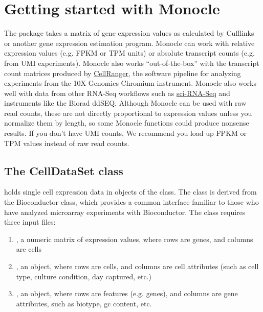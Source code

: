 \documentclass[10pt,oneside]{article}\usepackage[]{graphicx}\usepackage[]{color}
\begin{document}
 \section{Getting started with Monocle}
 
 The  package takes a matrix of gene expression values as calculated by Cufflinks\cite{Trapnell:2012kp} or another gene expression estimation program. Monocle can work with relative expression values (e.g. FPKM or TPM units) or absolute transcript counts (e.g. from UMI experiments). Monocle also works ``out-of-the-box'' with the transcript count matrices produced by \href{https://support.10xgenomics.com/single-cell/software/overview/welcome}{CellRanger}, the software pipeline for analyzing experiments from the 10X Genomics Chromium instrument. Monocle also works well with data from other RNA-Seq workflows such as \href{http://biorxiv.org/content/early/2017/02/02/104844}{sci-RNA-Seq} and instruments like the Biorad ddSEQ. Although Monocle can be used with raw read counts, these are not directly proportional to expression values unless you normalize them by length, so some Monocle functions could produce nonsense results. If you don't have UMI counts, We recommend you load up FPKM or TPM values instead of raw read counts.
 
 \subsection{The CellDataSet class}
 
  holds single cell expression data in objects of the  class. The class is derived from the Bioconductor  class, which provides a common interface familiar to those who have analyzed microarray experiments with Bioconductor. The class requires three input files:
 \begin{enumerate}
 \item {}, a numeric matrix of expression values, where rows are genes, and columns are cells
 \item {}, an  object, where rows are cells, and columns are cell attributes (such as cell type, culture condition, day captured, etc.)
 \item {}, an  object, where rows are features (e.g. genes), and columns are gene attributes, such as biotype, gc content, etc.
 \end{enumerate}
 
\end{document}
